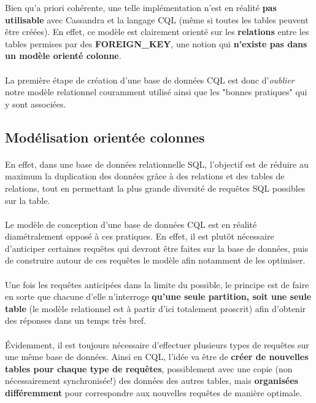 \documentclass[a4paper, 11pt]{article}
\begin{document}
Bien qu'a priori cohérente, une telle implémentation n'est en réalité \textbf{pas utilisable} avec Cassandra et la langage CQL (même si toutes les tables peuvent être créées). En effet, ce modèle est clairement orienté sur les \textbf{relations} entre les tables permises par des \textbf{FOREIGN\_KEY}, une notion qui \textbf{n'existe pas dans un modèle orienté colonne}.

\paragraph{}
La première étape de création d'une base de données CQL est donc d'\emph{oublier} notre modèle relationnel couramment utilisé ainsi que les "bonnes pratiques" qui y sont associées. 

\subsection{Modélisation orientée colonnes}
\paragraph{}
En effet, dans une base de données relationnelle SQL, l'objectif est de réduire au maximum la duplication des données grâce à des relations et des tables de relations, tout en permettant la plus grande diversité de requêtes SQL possibles sur la table.

\paragraph{}
Le modèle de conception d'une base de données CQL est en réalité diamétralement opposé à ces pratiques. En effet, il est plutôt nécessaire d'anticiper certaines requêtes qui devront être faites sur la base de données, puis de construire autour de ces requêtes le modèle afin notamment de les optimiser.

\paragraph{}
Une fois les requêtes anticipées dans la limite du possible, le principe est de faire en sorte que chacune d'elle n'interroge \textbf{qu'une seule partition, soit une seule table} (le modèle relationnel est à partir d'ici totalement proscrit) afin d'obtenir des réponses dans un temps très bref.

\paragraph{}
Évidemment, il est toujours nécessaire d'effectuer plusieurs types de requêtes sur une même base de données. Ainsi en CQL, l'idée va être de \textbf{créer de nouvelles tables pour chaque type de requêtes}, possiblement avec une copie (non nécessairement synchronisée!) des données des autres tables, mais \textbf{organisées différemment} pour correspondre aux nouvelles requêtes de manière optimale.
\end{document}
